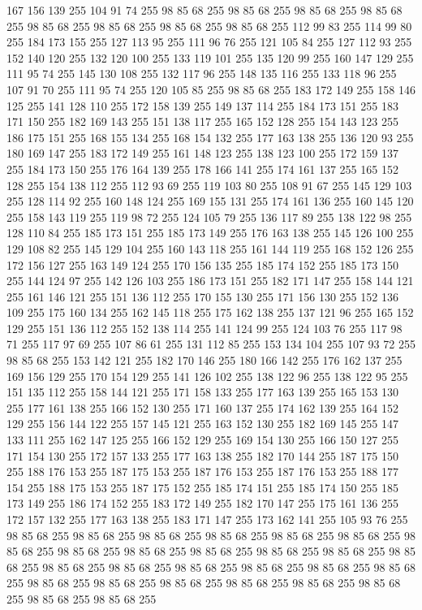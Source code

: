 167 156 139 255 104 91 74 255 98 85 68 255 98 85 68 255 98 85 68 255 98 85 68 255 98 85 68 255 98 85 68 255 98 85 68 255 98 85 68 255 112 99 83 255 114 99 80 255 184 173 155 255 127 113 95 255 111 96 76 255 121 105 84 255 127 112 93 255 152 140 120 255 132 120 100 255 133 119 101 255 135 120 99 255 160 147 129 255 111 95 74 255 145 130 108 255 132 117 96 255 148 135 116 255 133 118 96 255 107 91 70 255 111 95 74 255 120 105 85 255 98 85 68 255 183 172 149 255 158 146 125 255 141 128 110 255 172 158 139 255 149 137 114 255 184 173 151 255 183 171 150 255 182 169 143 255 151 138 117 255 165 152 128 255 154 143 123 255 186 175 151 255 168 155 134 255 168 154 132 255 177 163 138 255 136 120 93 255 180 169 147 255 183 172 149 255 161 148 123 255 138 123 100 255 172 159 137 255 184 173 150 255 176 164 139 255 178 166 141 255 174 161 137 255 165 152 128 255 154 138 112 255 112 93 69 255 119 103 80 255 108 91 67 255 145 129 103 255 128 114 92 255 160 148 124 255
169 155 131 255 174 161 136 255 160 145 120 255 158 143 119 255 119 98 72 255 124 105 79 255 136 117 89 255 138 122 98 255 128 110 84 255 185 173 151 255 185 173 149 255 176 163 138 255 145 126 100 255 129 108 82 255 145 129 104 255 160 143 118 255 161 144 119 255 168 152 126 255 172 156 127 255 163 149 124 255 170 156 135 255 185 174 152 255 185 173 150 255 144 124 97 255 142 126 103 255 186 173 151 255 182 171 147 255 158 144 121 255 161 146 121 255 151 136 112 255 170 155 130 255 171 156 130 255 152 136 109 255 175 160 134 255 162 145 118 255 175 162 138 255 137 121 96 255 165 152 129 255 151 136 112 255 152 138 114 255 141 124 99 255 124 103 76 255 117 98 71 255 117 97 69 255 107 86 61 255 131 112 85 255 153 134 104 255 107 93 72 255 98 85 68 255 153 142 121 255 182 170 146 255 180 166 142 255 176 162 137 255 169 156 129 255 170 154 129 255 141 126 102 255 138 122 96 255 138 122 95 255 151 135 112 255 158 144 121 255 171 158 133 255 177 163 139 255 165 153 130 255 177 161 138 255
166 152 130 255 171 160 137 255 174 162 139 255 164 152 129 255 156 144 122 255 157 145 121 255 163 152 130 255 182 169 145 255 147 133 111 255 162 147 125 255 166 152 129 255 169 154 130 255 166 150 127 255 171 154 130 255 172 157 133 255 177 163 138 255 182 170 144 255 187 175 150 255 188 176 153 255 187 175 153 255 187 176 153 255 187 176 153 255 188 177 154 255 188 175 153 255 187 175 152 255 185 174 151 255 185 174 150 255 185 173 149 255 186 174 152 255 183 172 149 255 182 170 147 255 175 161 136 255 172 157 132 255 177 163 138 255 183 171 147 255 173 162 141 255 105 93 76 255 98 85 68 255 98 85 68 255 98 85 68 255 98 85 68 255 98 85 68 255 98 85 68 255 98 85 68 255 98 85 68 255 98 85 68 255 98 85 68 255 98 85 68 255 98 85 68 255 98 85 68 255 98 85 68 255 98 85 68 255 98 85 68 255 98 85 68 255 98 85 68 255 98 85 68 255 98 85 68 255 98 85 68 255 98 85 68 255 98 85 68 255 98 85 68 255 98 85 68 255 98 85 68 255 98 85 68 255
